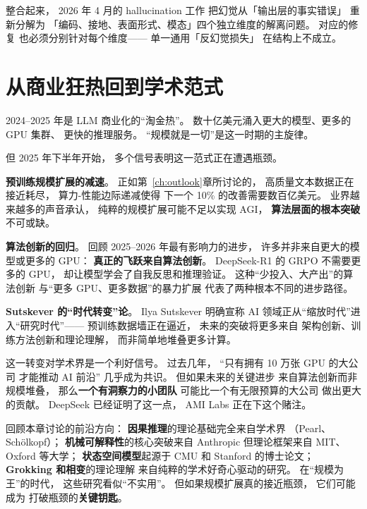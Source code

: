 整合起来，
2026 年 4 月的 hallucination 工作
把幻觉从「输出层的事实错误」
重新分解为
「编码、接地、表面形式、模态」四个独立维度的解离问题。
对应的修复
也必须分别针对每个维度——
单一通用「反幻觉损失」
在结构上不成立。


\section{从商业狂热回到学术范式}
\label{sec:back-to-academia}

2024--2025 年是 LLM 商业化的``淘金热''。
数十亿美元涌入更大的模型、更多的 GPU 集群、
更快的推理服务。
``规模就是一切''是这一时期的主旋律。

但 2025 年下半年开始，
多个信号表明这一范式正在遭遇瓶颈。

\textbf{预训练规模扩展的减速}。
正如第~\ref{ch:outlook}章所讨论的，
高质量文本数据正在接近耗尽，
算力-性能边际递减使得
下一个 10\% 的改善需要数百亿美元。
业界越来越多的声音承认，
纯粹的规模扩展可能不足以实现 AGI，
\textbf{算法层面的根本突破}不可或缺。

\textbf{算法创新的回归}。
回顾 2025--2026 年最有影响力的进步，
许多并非来自更大的模型或更多的 GPU：
\textbf{真正的飞跃来自算法创新}。
DeepSeek-R1 的 GRPO 不需要更多的 GPU，
却让模型学会了自我反思和推理验证。
这种``少投入、大产出''的算法创新
与``更多 GPU、更多数据''的暴力扩展
代表了两种根本不同的进步路径。

\textbf{Sutskever 的``时代转变''论}。
Ilya Sutskever 明确宣称
AI 领域正从``缩放时代''进入``研究时代''——
预训练数据墙正在逼近，
未来的突破将更多来自
架构创新、训练方法创新和理论理解，
而非简单地堆叠更多计算。

这一转变对学术界是一个利好信号。
过去几年，
``只有拥有 10 万张 GPU 的大公司
才能推动 AI 前沿''
几乎成为共识。
但如果未来的关键进步
来自算法创新而非规模堆叠，
那么\textbf{一个有洞察力的小团队}
可能比一个有无限预算的大公司
做出更大的贡献。
DeepSeek 已经证明了这一点，
AMI Labs 正在下这个赌注。

\begin{corebox}[学术界可以贡献什么？]
回顾本章讨论的前沿方向：
\textbf{因果推理}的理论基础完全来自学术界
（Pearl、Sch\"{o}lkopf）；
\textbf{机械可解释性}的核心突破来自 Anthropic
但理论框架来自 MIT、Oxford 等大学；
\textbf{状态空间模型}起源于 CMU 和 Stanford 的博士论文；
\textbf{Grokking 和相变}的理论理解
来自纯粹的学术好奇心驱动的研究。
在``规模为王''的时代，
这些研究看似``不实用''。
但如果规模扩展真的接近瓶颈，
它们可能成为
打破瓶颈的\textbf{关键钥匙}。
\end{corebox}


